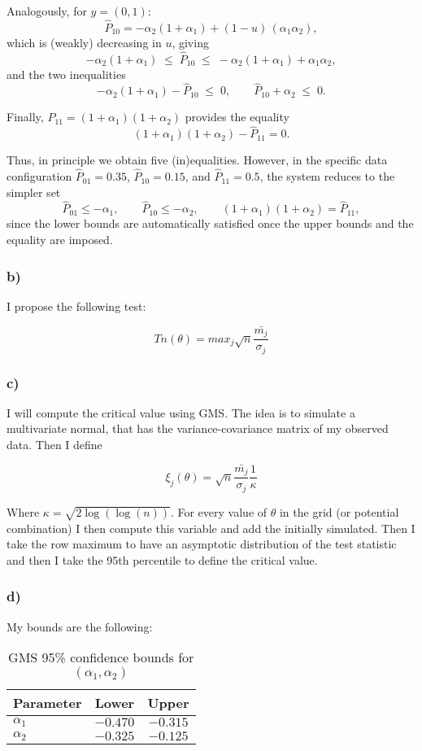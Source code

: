 \documentclass{article}
\begin{document}
Analogously, for $y=(0,1)$:
\[
\hat P_{10} = -\alpha_2(1+\alpha_1) + (1-u)\,(\alpha_1\alpha_2),
\]
which is (weakly) decreasing in $u$, giving
\[
-\alpha_2(1+\alpha_1) \;\le\; \hat P_{10} \;\le\; -\alpha_2(1+\alpha_1) + \alpha_1\alpha_2,
\]
and the two inequalities
\[
-\alpha_2(1+\alpha_1) - \hat P_{10} \;\le\; 0,
\qquad
\hat P_{10} + \alpha_2 \;\le\; 0.
\]

Finally, $P_{11}=(1+\alpha_1)(1+\alpha_2)$ provides the equality
\[
(1+\alpha_1)(1+\alpha_2) - \hat P_{11} = 0.
\]

Thus, in principle we obtain five (in)equalities. However, in the specific data configuration 
$\hat P_{01}=0.35$, $\hat P_{10}=0.15$, and $\hat P_{11}=0.5$, the system reduces to the simpler set
\[
\hat P_{01} \le -\alpha_1,\qquad \hat P_{10} \le -\alpha_2,\qquad (1+\alpha_1)(1+\alpha_2)=\hat P_{11},
\]
since the lower bounds are automatically satisfied once the upper bounds and the equality are imposed.


\subsubsection*{b)}
I propose the following test:

\[
Tn(\theta)= max_{j} \sqrt{n} \frac{\bar{m_j}}{\sigma_j}
\]


\subsubsection*{c)}
I will compute the critical value using GMS. The idea is to simulate a multivariate normal, that has the variance-covariance matrix of my observed data. Then I define

\[
\xi_{j}(\theta)=\sqrt{n} \frac{\bar{m_j}}{\sigma_j} \frac{1}{\kappa}
\]

Where \(\kappa=\sqrt{2 \log(\log(n))}\). For every value of $\theta$ in the grid (or potential combination) I then compute this variable and add the initially simulated. Then I take the row maximum to have an asymptotic distribution of the test statistic and then I take the 95th percentile to define the critical value.



\subsubsection*{d)}
My bounds are the following: 

\begin{table}[H]
\centering
\caption{GMS 95\% confidence bounds for $(\alpha_1,\alpha_2)$}
\label{tab:gms_bounds}
\begin{tabular}{lcc}
\toprule
Parameter & Lower & Upper \\
\midrule
$\alpha_1$ & $-0.470$ & $-0.315$ \\
$\alpha_2$ & $-0.325$ & $-0.125$ \\
\bottomrule
\end{tabular}
\end{table}
\end{document}
